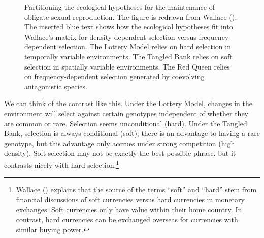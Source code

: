 \documentclass[
  letterpaper,
]{book}
\begin{document}
\begin{figure}


\caption[Partitioning the ecological hypotheses for the maintenance of
obligate sexual reproduction]{\label{fig-2-2}Partitioning the ecological
hypotheses for the maintenance of obligate sexual reproduction. The
figure is redrawn from Wallace (). The
inserted blue text shows how the ecological hypotheses fit into
Wallace's matrix for density-dependent selection versus
frequency-dependent selection. The Lottery Model relies on hard
selection in temporally variable environments. The Tangled Bank relies
on soft selection in spatially variable environments. The Red Queen
relies on frequency-dependent selection generated by coevolving
antagonistic species.}

\end{figure}%

We can think of the contrast like this. Under the Lottery Model, changes
in the environment will select against certain genotypes independent of
whether they are common or rare. Selection seems unconditional (hard).
Under the Tangled Bank, selection is always conditional (soft); there is
an advantage to having a rare genotype, but this advantage only accrues
under strong competition (high density). Soft selection may not be
exactly the best possible phrase, but it contrasts nicely with hard
selection.\footnote{Wallace () explains
  that the source of the terms ``soft'' and ``hard'' stem from financial
  discussions of soft currencies versus hard currencies in monetary
  exchanges. Soft currencies only have value within their home country.
  In contrast, hard currencies can be exchanged overseas for currencies
  with similar buying power.}
\end{document}
